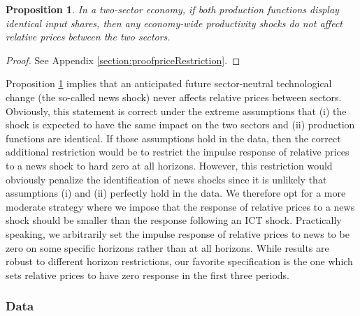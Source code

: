 \documentclass[12pt]{article}
\newtheorem{prop}{Proposition}
\begin{document}
\begin{prop}\label{prop:priceRestriction}
In a two-sector economy, if both production functions display identical input shares, then any economy-wide productivity shocks do not affect relative prices between the two sectors.
\end{prop}
\begin{proof}
	See Appendix \ref{section:proofpriceRestriction}.
\end{proof}

Proposition \ref{prop:priceRestriction} implies that an anticipated future sector-neutral technological change (the so-called news shock) never affects relative prices between sectors. Obviously, this statement is correct under the extreme assumptions that (i) the shock is expected to have the same impact on the two sectors and (ii) production functions are identical. If those assumptions hold in the data, then the correct additional restriction would be to  restrict the impulse response of relative prices to a news shock to hard zero at all horizons. However, this restriction would obviously penalize the identification of news shocks since it is unlikely that assumptions (i) and (ii) perfectly hold in the data. We therefore opt for a more moderate strategy where we impose that the response of relative prices to a news shock should be smaller than the response following an ICT shock. Practically speaking, we arbitrarily set the impulse response of relative prices to news to be zero on some specific horizons rather than at all horizons. While results are robust to different horizon restrictions, our favorite specification is the one which sets relative prices to have zero response in the first three periods. 

\subsubsection*{Data}
\end{document}

